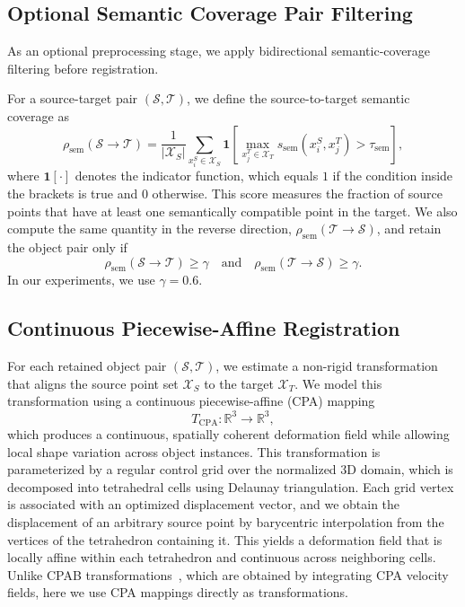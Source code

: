 \subsection{Optional Semantic Coverage Pair Filtering}
\label{sec:pair_filter}

As an optional preprocessing stage, we apply bidirectional semantic-coverage filtering before registration.

For a source-target pair \((\mathcal{S},\mathcal{T})\), we define the source-to-target semantic coverage as
\begin{equation}
\label{eq:semantic_coverage}
\rho_{\mathrm{sem}}(\mathcal{S} \rightarrow \mathcal{T})
=
\frac{1}{|\mathcal{X}_S|}
\sum_{x_i^S \in \mathcal{X}_S}
\mathbf{1}
\left[
\max_{x_j^T \in \mathcal{X}_T}
s_{\mathrm{sem}}(x_i^S,x_j^T)
>
\tau_{\mathrm{sem}}
\right],
\end{equation}
where \(\mathbf{1}[\cdot]\) denotes the indicator function, which equals \(1\) if the condition inside the brackets is true and \(0\) otherwise. This score measures the fraction of source points that have at least one semantically compatible point in the target.
We also compute the same quantity in the reverse direction, \(\rho_{\mathrm{sem}}(\mathcal{T} \rightarrow \mathcal{S})\), and retain the object pair only if
\begin{equation}
\label{eq:pair_filter}
\rho_{\mathrm{sem}}(\mathcal{S} \rightarrow \mathcal{T}) \geq \gamma
\quad \text{and} \quad
\rho_{\mathrm{sem}}(\mathcal{T} \rightarrow \mathcal{S}) \geq \gamma .
\end{equation}
In our experiments, we use \(\gamma = 0.6\).



\subsection{Continuous Piecewise-Affine Registration}
\label{sec:registration_cpa}

For each retained object pair \((\mathcal{S},\mathcal{T})\), we estimate a non-rigid transformation that aligns the source point set \(\mathcal{X}_S\) to the target \(\mathcal{X}_T\).
We model this transformation using a continuous piecewise-affine (CPA) mapping
\begin{equation}
\label{eq:cpa_transform}
T_{\mathrm{CPA}}:\mathbb{R}^{3}\rightarrow\mathbb{R}^{3},
\end{equation}
which produces a continuous, spatially coherent deformation field while allowing local shape variation across object instances.
%
This transformation is parameterized by a regular control grid over the normalized 3D domain, which is decomposed into tetrahedral cells using Delaunay triangulation.
Each grid vertex is associated with an optimized displacement vector, and we obtain the displacement of an arbitrary source point by barycentric interpolation from the vertices of the tetrahedron containing it.
This yields a deformation field that is locally affine within each tetrahedron and continuous across neighboring cells. Unlike CPAB transformations~\cite{Freifeld:TPAMI:2017:CPAB,Aflalo:NeurIPS:2026:FG-CPAB}, which are obtained by integrating CPA velocity fields, here we use CPA mappings directly as transformations.

